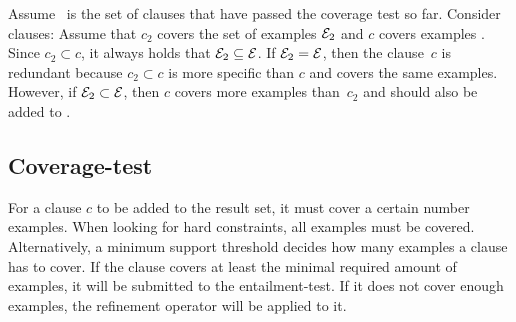 \begin{example}
	Assume~ is the set of clauses that have passed the coverage test so far. Consider clauses:
	Assume that $c_2$ covers the set of examples $_2$ and $c$ covers examples \sym{E}.
	Since $c_2 \subset c$, it always holds that $\mathcal{E}_2 \subseteq \mathcal{E}$.
	If $\mathcal{E}_2 = \mathcal{E}$, then the clause~$c$ is redundant because $c_2 \subset c$ is more specific than $c$ and covers the same examples.
	However, if $\mathcal{E}_2 \subset \mathcal{E}$, then $c$ covers more examples than~$c_2$ and should also be added to .
\end{example}

\subsection{Coverage-test}
For a clause $c$ to be added to the result set, it must cover a certain number examples.
When looking for hard constraints, all examples must be covered.
Alternatively, a minimum support threshold decides how many examples a clause has to cover.
If the clause covers at least the minimal required amount of examples, it will be submitted to the entailment-test.
If it does not cover enough examples, the refinement operator will be applied to it.

